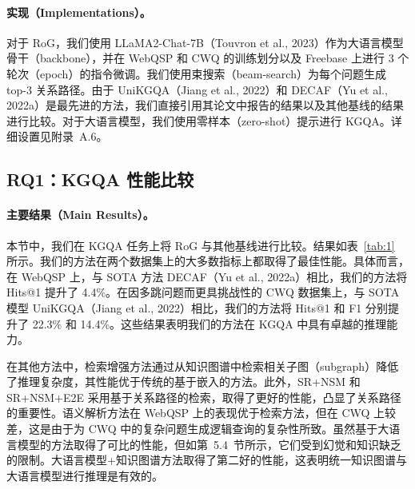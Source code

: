 \documentclass[11pt,UTF8,fontset=fandol]{ctexart}
\begin{document}
\paragraph{实现（Implementations）。}
对于 RoG，我们使用 LLaMA2-Chat-7B（Touvron et al., 2023）作为大语言模型骨干（backbone），并在 WebQSP 和 CWQ 的训练划分以及 Freebase 上进行 3 个轮次（epoch）的指令微调。我们使用束搜索（beam-search）为每个问题生成 top-3 关系路径。由于 UniKGQA（Jiang et al., 2022）和 DECAF（Yu et al., 2022a）是最先进的方法，我们直接引用其论文中报告的结果以及其他基线的结果进行比较。对于大语言模型，我们使用零样本（zero-shot）提示进行 KGQA。详细设置见附录~A.6。

\subsection{RQ1：KGQA 性能比较}

\paragraph{主要结果（Main Results）。}
本节中，我们在 KGQA 任务上将 RoG 与其他基线进行比较。结果如表~\ref{tab:1} 所示。我们的方法在两个数据集上的大多数指标上都取得了最佳性能。具体而言，在 WebQSP 上，与 SOTA 方法 DECAF（Yu et al., 2022a）相比，我们的方法将 Hits@1 提升了 4.4\%。在因多跳问题而更具挑战性的 CWQ 数据集上，与 SOTA 模型 UniKGQA（Jiang et al., 2022）相比，我们的方法将 Hits@1 和 F1 分别提升了 22.3\% 和 14.4\%。这些结果表明我们的方法在 KGQA 中具有卓越的推理能力。

在其他方法中，检索增强方法通过从知识图谱中检索相关子图（subgraph）降低了推理复杂度，其性能优于传统的基于嵌入的方法。此外，SR+NSM 和 SR+NSM+E2E 采用基于关系路径的检索，取得了更好的性能，凸显了关系路径的重要性。语义解析方法在 WebQSP 上的表现优于检索方法，但在 CWQ 上较差，这是由于为 CWQ 中的复杂问题生成逻辑查询的复杂性所致。虽然基于大语言模型的方法取得了可比的性能，但如第~5.4~节所示，它们受到幻觉和知识缺乏的限制。大语言模型+知识图谱方法取得了第二好的性能，这表明统一知识图谱与大语言模型进行推理是有效的。
\end{document}
